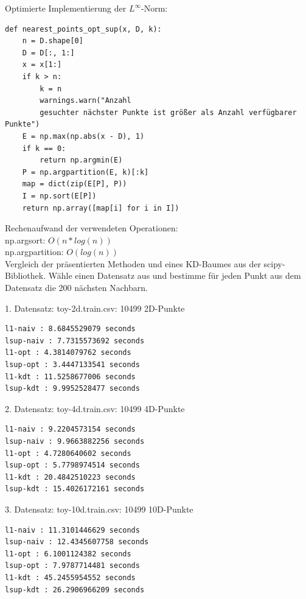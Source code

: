 \documentclass{beamer}
\begin{document}
\begin{frame}[fragile]
Optimierte Implementierung der $L^{\infty}$-Norm:
\begin{verbatim}
def nearest_points_opt_sup(x, D, k):
    n = D.shape[0]
    D = D[:, 1:]
    x = x[1:]
    if k > n:
        k = n 
        warnings.warn("Anzahl 
        gesuchter nächster Punkte ist größer als Anzahl verfügbarer Punkte")
    E = np.max(np.abs(x - D), 1)
    if k == 0:
        return np.argmin(E)
    P = np.argpartition(E, k)[:k]
    map = dict(zip(E[P], P))
    I = np.sort(E[P])
    return np.array([map[i] for i in I])
\end{verbatim}
\end{frame}

\begin{frame}
Rechenaufwand der verwendeten Operationen:\\
np.argsort: $O(n*log(n))$\\
np.argpartition: $O(log(n))$\\
Vergleich der präsentierten Methoden und eines KD-Baumes aus der scipy-Bibliothek.
Wähle einen Datensatz aus und bestimme für jeden Punkt aus dem Datensatz die 200 nächsten Nachbarn.
\end{frame}

\begin{frame}[fragile]
1. Datensatz: toy-2d.train.csv: 10499 2D-Punkte
\begin{verbatim}
l1-naiv : 8.6845529079 seconds
lsup-naiv : 7.7315573692 seconds
l1-opt : 4.3814079762 seconds
lsup-opt : 3.4447133541 seconds
l1-kdt : 11.5258677006 seconds
lsup-kdt : 9.9952528477 seconds
\end{verbatim}
\end{frame}

\begin{frame}[fragile]
2. Datensatz: toy-4d.train.csv: 10499 4D-Punkte
\begin{verbatim}
l1-naiv : 9.2204573154 seconds
lsup-naiv : 9.9663882256 seconds
l1-opt : 4.7280640602 seconds
lsup-opt : 5.7798974514 seconds
l1-kdt : 20.4842510223 seconds
lsup-kdt : 15.4026172161 seconds
\end{verbatim}
\end{frame}

\begin{frame}[fragile]
3. Datensatz: toy-10d.train.csv: 10499 10D-Punkte
\begin{verbatim}
l1-naiv : 11.3101446629 seconds
lsup-naiv : 12.4345607758 seconds
l1-opt : 6.1001124382 seconds
lsup-opt : 7.9787714481 seconds
l1-kdt : 45.2455954552 seconds
lsup-kdt : 26.2906966209 seconds
\end{verbatim}
\end{frame}
\end{document}
